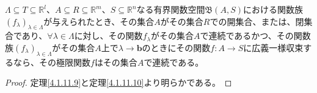 \documentclass[dvipdfmx]{jsarticle}
\begin{document}
\begin{thm}\label{4.1.11.13}
$\varLambda \subseteq T \subseteq \mathbb{R}^{l}$、$A \subseteq R \subseteq \mathbb{R}^{m}$、$S \subseteq \mathbb{R}^{n}$なる有界関数空間$\mathfrak{B}(A,S)$における関数族$\left( f_{\lambda} \right)_{\lambda \in \varLambda}$が与えられたとき、その集合$A$がその集合$R$での開集合、または、閉集合であり、$\forall\lambda \in \varLambda$に対し、その関数$f_{\lambda}$がその集合$A$で連続であるかつ、その関数族$\left( f_{\lambda} \right)_{\lambda \in \varLambda}$がその集合$A$上で$\lambda \rightarrow \mathbf{b}$のときにその関数$f:A \rightarrow S$に広義一様収束するなら、その極限関数$f$はその集合$A$で連続である。
\end{thm}
\begin{proof} 定理\ref{4.1.11.9}と定理\ref{4.1.11.10}より明らかである。
\end{proof}
\end{document}
